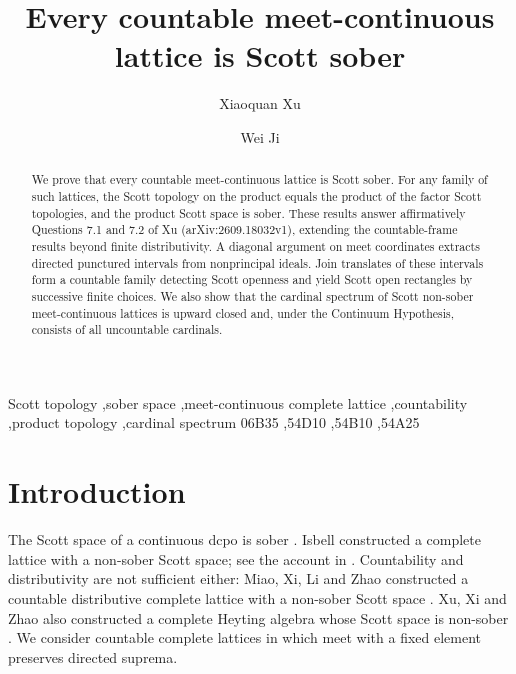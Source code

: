 \documentclass[preprint,11pt]{elsarticle}
\theoremstyle{definition}
\theoremstyle{remark}
\numberwithin{equation}{section}
\begin{document}
\begin{frontmatter}
\title{Every countable meet-continuous lattice is Scott sober}

\author[nit]{Xiaoquan Xu}

\author[guilin]{Wei Ji}


\address[nit]{School of Computer Information Engineering, Nanchang Institute of Technology, Nanchang 330044, China}
\address[guilin]{School of Mathematics and Statistics, Guilin University of Technology, Guilin 541004, China}

\begin{abstract}
We prove that every countable meet-continuous lattice is Scott sober. For any family of such lattices, the Scott topology on the product equals the product of the factor Scott topologies, and the product Scott space is sober. These results answer affirmatively Questions 7.1 and 7.2 of Xu (arXiv:2609.18032v1), extending the countable-frame results beyond finite distributivity. A diagonal argument on meet coordinates extracts directed punctured intervals from nonprincipal ideals. Join translates of these intervals form a countable family detecting Scott openness and yield Scott open rectangles by successive finite choices. We also show that the cardinal spectrum of Scott non-sober meet-continuous lattices is upward closed and, under the Continuum Hypothesis, consists of all uncountable cardinals.
\end{abstract}
\begin{keyword}
Scott topology \sep sober space \sep meet-continuous complete lattice \sep countability \sep product topology \sep cardinal spectrum
\MSC[2020] 06B35 \sep 54D10 \sep 54B10 \sep 54A25
\end{keyword}
\end{frontmatter}

\section{Introduction}
The Scott space of a continuous dcpo is sober \cite{Gierz}. Isbell constructed a complete lattice with a non-sober Scott space; see the account in \cite[Section~7]{Hertling}. Countability and distributivity are not sufficient either: Miao, Xi, Li and Zhao constructed a countable distributive complete lattice with a non-sober Scott space \cite{Miao}. Xu, Xi and Zhao also constructed a complete Heyting algebra whose Scott space is non-sober \cite{XuXiZhao}. We consider countable complete lattices in which meet with a fixed element preserves directed suprema.
\end{document}
